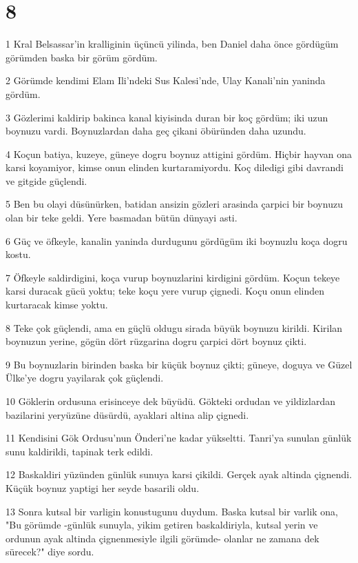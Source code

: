 \chapter{8}

\par 1 Kral Belsassar'in kralliginin üçüncü yilinda, ben Daniel daha önce gördügüm görümden baska bir görüm gördüm.
\par 2 Görümde kendimi Elam Ili'ndeki Sus Kalesi'nde, Ulay Kanali'nin yaninda gördüm.
\par 3 Gözlerimi kaldirip bakinca kanal kiyisinda duran bir koç gördüm; iki uzun boynuzu vardi. Boynuzlardan daha geç çikani öbüründen daha uzundu.
\par 4 Koçun batiya, kuzeye, güneye dogru boynuz attigini gördüm. Hiçbir hayvan ona karsi koyamiyor, kimse onun elinden kurtaramiyordu. Koç diledigi gibi davrandi ve gitgide güçlendi.
\par 5 Ben bu olayi düsünürken, batidan ansizin gözleri arasinda çarpici bir boynuzu olan bir teke geldi. Yere basmadan bütün dünyayi asti.
\par 6 Güç ve öfkeyle, kanalin yaninda durdugunu gördügüm iki boynuzlu koça dogru kostu.
\par 7 Öfkeyle saldirdigini, koça vurup boynuzlarini kirdigini gördüm. Koçun tekeye karsi duracak gücü yoktu; teke koçu yere vurup çignedi. Koçu onun elinden kurtaracak kimse yoktu.
\par 8 Teke çok güçlendi, ama en güçlü oldugu sirada büyük boynuzu kirildi. Kirilan boynuzun yerine, gögün dört rüzgarina dogru çarpici dört boynuz çikti.
\par 9 Bu boynuzlarin birinden baska bir küçük boynuz çikti; güneye, doguya ve Güzel Ülke'ye dogru yayilarak çok güçlendi.
\par 10 Göklerin ordusuna erisinceye dek büyüdü. Gökteki ordudan ve yildizlardan bazilarini yeryüzüne düsürdü, ayaklari altina alip çignedi.
\par 11 Kendisini Gök Ordusu'nun Önderi'ne kadar yükseltti. Tanri'ya sunulan günlük sunu kaldirildi, tapinak terk edildi.
\par 12 Baskaldiri yüzünden günlük sunuya karsi çikildi. Gerçek ayak altinda çignendi. Küçük boynuz yaptigi her seyde basarili oldu.
\par 13 Sonra kutsal bir varligin konustugunu duydum. Baska kutsal bir varlik ona, "Bu görümde -günlük sunuyla, yikim getiren baskaldiriyla, kutsal yerin ve ordunun ayak altinda çignenmesiyle ilgili görümde- olanlar ne zamana dek sürecek?" diye sordu.
